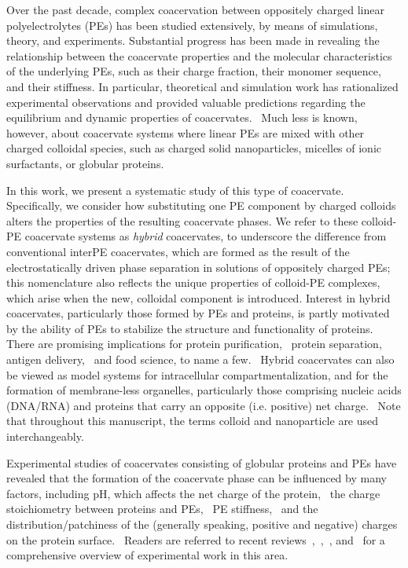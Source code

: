 \documentclass[journal=mamobx, manuscript=article]{achemso}
\begin{document}
Over the past decade, complex coacervation between oppositely charged linear polyelectrolytes (PEs) has been studied extensively, by means of simulations, theory, and experiments. Substantial progress has been made in revealing the relationship between the coacervate properties and the molecular characteristics of the underlying PEs, such as their charge fraction, their monomer sequence, and their stiffness. In particular, theoretical and simulation work has rationalized experimental observations and provided valuable predictions regarding the equilibrium and dynamic properties of coacervates.~\cite{delaney2017theory,sing2020recent,rumyantsev2021polyelectrolyte,zhang2021interfacial} Much less is known, however, about coacervate systems where linear PEs are mixed with other charged colloidal species, such as charged solid nanoparticles, micelles of ionic surfactants, or globular proteins.

In this work, we present a systematic study of this type of coacervate. Specifically, we consider how substituting one PE component by charged colloids alters the properties of the resulting coacervate phases. We refer to these colloid-PE coacervate systems as \textit{hybrid} coacervates, to underscore the difference from conventional interPE coacervates, which are formed as the result of the electrostatically driven phase separation in solutions of oppositely charged PEs; this nomenclature also reflects the unique properties of colloid-PE complexes, which arise when the new, colloidal component is introduced. Interest in hybrid coacervates, particularly those formed by PEs and proteins, is partly motivated by the ability of PEs to stabilize the structure and functionality of proteins.~\cite{xu2017selective} There are promising implications for protein purification,~\cite{xu2011protein,xu2017selective} protein separation,~\cite{mctigue2019design,xu2017selective} antigen delivery,~\cite{hwang2020single,jeon2022enhancing} and food science, to name a few.~\cite{turgeon2009protein+,jun2011microencapsulation} Hybrid coacervates can also be viewed as model systems for intracellular compartmentalization, and for the formation of membrane-less organelles, particularly those comprising nucleic acids (DNA/RNA) and proteins that carry an opposite (i.e. positive) net charge.~\cite{devi2017encapsulation,blocher2020protein} Note that throughout this manuscript, the terms colloid and nanoparticle are used interchangeably.

Experimental studies of coacervates consisting of globular proteins and PEs have revealed that the formation of the coacervate phase can be influenced by many factors, including pH, which affects the net charge of the protein,~\cite{comert2016coacervation,comert2017liquid} the charge stoichiometry between proteins and PEs,~\cite{yan2013heteroprotein,kayitmazer2015complex} PE stiffness,~\cite{gao2019protein} and the distribution/patchiness of the (generally speaking, positive and negative) charges on the protein surface.~\cite{kim2020effect} Readers are referred to recent reviews~,~,~, and~ for a comprehensive overview of experimental work in this area. 
\end{document}
